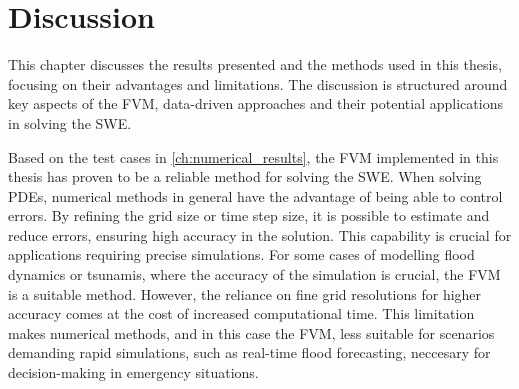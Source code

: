 \chapter{Discussion}\label{ch:discussion}
This chapter discusses the results presented and the methods used in this thesis, focusing on their advantages and limitations.
The discussion is structured around key aspects of the FVM, data-driven approaches and their potential applications in solving the SWE.

Based on the test cases in \autoref{ch:numerical_results}, the FVM implemented in this thesis has proven to be a reliable method for solving the SWE.
When solving PDEs, numerical methods in general have the advantage of being able to control errors.
By refining the grid size or time step size, it is possible to estimate and reduce errors, ensuring high accuracy in the solution.
This capability is crucial for applications requiring precise simulations.
For some cases of modelling flood dynamics or tsunamis, where the accuracy of the simulation is crucial, the FVM is a suitable method.
However, the reliance on fine grid resolutions for higher accuracy comes at the cost of increased computational time.
This limitation makes numerical methods, and in this case the FVM, less suitable for scenarios demanding rapid simulations, such as real-time flood forecasting, neccesary for decision-making in emergency situations.

